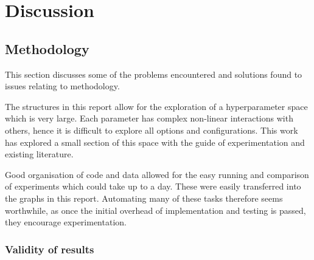 \chapter{Discussion}


  \section{Methodology}

    This section discusses some of the problems encountered and solutions found
    to issues relating to methodology.

    The structures in this report allow for the exploration of a hyperparameter
    space which is very large. Each parameter has complex non-linear interactions with
    others, hence it is difficult to explore all options and configurations.
    This work has explored a small section of this space with the guide of experimentation
    and existing literature.

    Good organisation of code and data allowed for the easy running
    and comparison of experiments which could take up to a day. These were easily transferred
    into the graphs in this report. Automating many of these tasks therefore seems worthwhile,
    as once the initial overhead of implementation and testing is passed, they encourage experimentation.

    \subsection{Validity of results}

